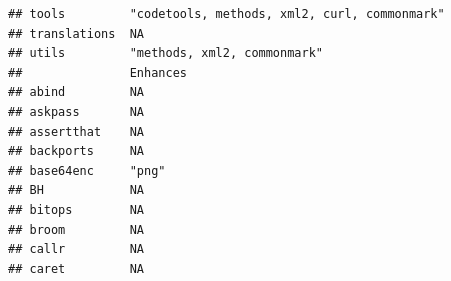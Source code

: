 \documentclass[]{article}
\begin{document}
\begin{verbatim}
## tools         "codetools, methods, xml2, curl, commonmark"                                                                                                                                                                                                                                                                                                                                                                                                                                                                                                                                              
## translations  NA                                                                                                                                                                                                                                                                                                                                                                                                                                                                                                                                                                                        
## utils         "methods, xml2, commonmark"                                                                                                                                                                                                                                                                                                                                                                                                                                                                                                                                                               
##               Enhances                                                  
## abind         NA                                                        
## askpass       NA                                                        
## assertthat    NA                                                        
## backports     NA                                                        
## base64enc     "png"                                                     
## BH            NA                                                        
## bitops        NA                                                        
## broom         NA                                                        
## callr         NA                                                        
## caret         NA                                                        

\end{verbatim}
\end{document}
